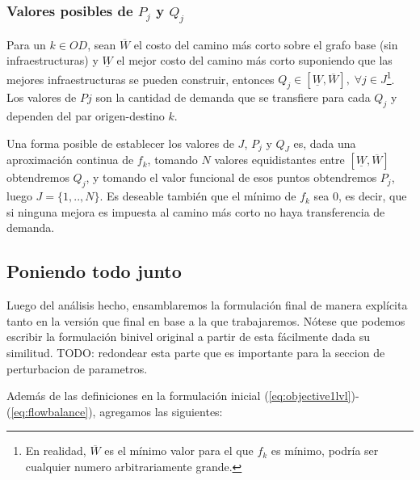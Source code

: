 \documentclass{article}
\begin{document}
  \subsubsection{Valores posibles de $P_j$ y $Q_j$}

  Para un $k \in OD$, sean $\overline{W}$ el costo del camino más corto sobre el grafo base (sin infraestructuras) y $\underline{W}$ el mejor costo del camino más corto suponiendo que las mejores infraestructuras se pueden construir, entonces $Q_j \in [\underline{W}, \overline{W}],\; \forall j \in J$\footnote{En realidad, $\overline{W}$ es el mínimo valor para el que $f_k$ es mínimo, podría ser cualquier numero arbitrariamente grande.}. Los valores de $Pj$ son la cantidad de demanda que se transfiere para cada $Q_j$ y dependen del par origen-destino $k$.

  Una forma posible de establecer los valores de $J$, $P_j$ y $Q_J$ es, dada una aproximación continua de $f_k$, tomando $N$ valores equidistantes entre $[\underline{W}, \overline{W}]$ obtendremos $Q_j$, y tomando el valor funcional de esos puntos obtendremos $P_j$, luego $J=\{1,..,N\}$. Es deseable también que el mínimo de $f_k$ sea 0, es decir, que si ninguna mejora es impuesta al camino más corto no haya transferencia de demanda.

  \subsection{Poniendo todo junto}

  Luego del análisis hecho, ensamblaremos la formulación final de manera explícita tanto en la versión que final en base a la que trabajaremos. Nótese que podemos escribir la formulación binivel original a partir de esta fácilmente dada su similitud.
   TODO: redondear esta parte que es importante para la seccion de perturbacion de parametros.

  Además de las definiciones en la formulación inicial (\ref{eq:objective1lvl})-(\ref{eq:flowbalance}), agregamos las siguientes:
\end{document}
